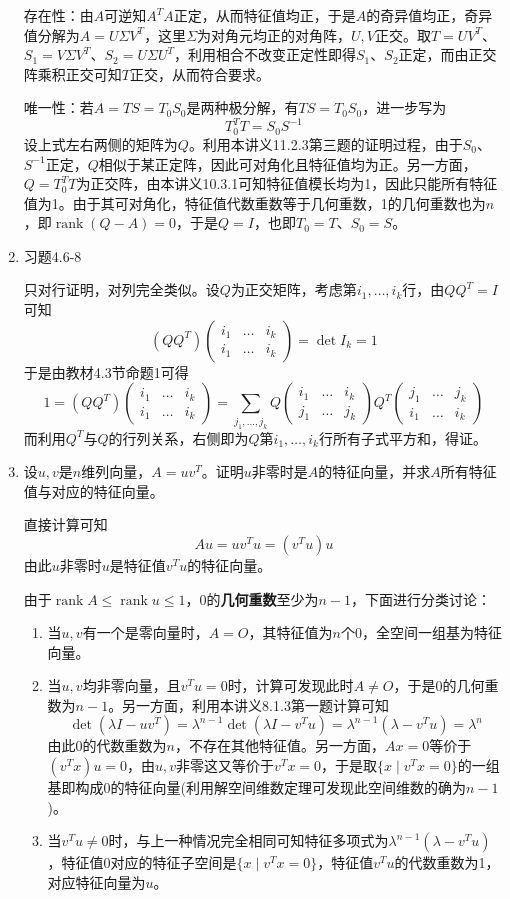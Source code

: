 \documentclass[a4paper,UTF8,fontset=windows]{ctexart}
\DeclareMathOperator{\rank}{rank}
\begin{document}
\begin{enumerate}
    存在性：由$A$可逆知$A^TA$正定，从而特征值均正，于是$A$的奇异值均正，奇异值分解为$A=U\Sigma V^T$，这里$\Sigma$为对角元均正的对角阵，$U,V$正交。取$T=UV^T$、$S_1=V\Sigma V^T$、$S_2=U\Sigma U^T$，利用相合不改变正定性即得$S_1$、$S_2$正定，而由正交阵乘积正交可知$T$正交，从而符合要求。

    唯一性：若$A=TS=T_0S_0$是两种极分解，有$TS=T_0S_0$，进一步写为
    $$T_0^TT=S_0S^{-1}$$
    设上式左右两侧的矩阵为$Q$。利用本讲义11.2.3第三题的证明过程，由于$S_0$、$S^{-1}$正定，$Q$相似于某正定阵，因此可对角化且特征值均为正。另一方面，$Q=T_0^TT$为正交阵，由本讲义10.3.1可知特征值模长均为1，因此只能所有特征值为1。由于其可对角化，特征值代数重数等于几何重数，1的几何重数也为$n$，即$\rank(Q-A)=0$，于是$Q=I$，也即$T_0=T$、$S_0=S$。

    \item 习题4.6-8
    
    只对行证明，对列完全类似。设$Q$为正交矩阵，考虑第$i_1,\dots,i_k$行，由$QQ^T=I$可知
    $$(QQ^T)\begin{pmatrix}i_1&\dots&i_k\\i_1&\dots&i_k\end{pmatrix}=\det I_k=1$$
    于是由教材4.3节命题1可得
    $$1=(QQ^T)\begin{pmatrix}i_1&\dots&i_k\\i_1&\dots&i_k\end{pmatrix}=\sum_{j_1,\dots,j_k}Q\begin{pmatrix}i_1&\dots&i_k\\j_1&\dots&j_k\end{pmatrix}Q^T\begin{pmatrix}j_1&\dots&j_k\\i_1&\dots&i_k\end{pmatrix}$$
    而利用$Q^T$与$Q$的行列关系，右侧即为$Q$第$i_1,\dots,i_k$行所有子式平方和，得证。

    \item 设$u,v$是$n$维列向量，$A=uv^T$。证明$u$非零时是$A$的特征向量，并求$A$所有特征值与对应的特征向量。
    
    直接计算可知
    $$Au=uv^Tu=(v^Tu)u$$
    由此$u$非零时$u$是特征值$v^Tu$的特征向量。

    由于$\rank A\le\rank u\le1$，0的\textbf{几何重数}至少为$n-1$，下面进行分类讨论：
    \begin{enumerate}
        \item 当$u,v$有一个是零向量时，$A=O$，其特征值为$n$个0，全空间一组基为特征向量。
        \item 当$u,v$均非零向量，且$v^Tu=0$时，计算可发现此时$A\ne O$，于是0的几何重数为$n-1$。另一方面，利用本讲义8.1.3第一题计算可知
        $$\det(\lambda I-uv^T)=\lambda^{n-1}\det(\lambda I-v^Tu)=\lambda^{n-1}(\lambda-v^Tu)=\lambda^n$$
        由此0的代数重数为$n$，不存在其他特征值。另一方面，$Ax=0$等价于$(v^Tx)u=0$，由$u,v$非零这又等价于$v^Tx=0$，于是取$\{x\mid v^Tx=0\}$的一组基即构成0的特征向量(利用解空间维数定理可发现此空间维数的确为$n-1$)。
        \item 当$v^Tu\ne0$时，与上一种情况完全相同可知特征多项式为$\lambda^{n-1}(\lambda-v^Tu)$，特征值0对应的特征子空间是$\{x\mid v^Tx=0\}$，特征值$v^Tu$的代数重数为1，对应特征向量为$u$。
    \end{enumerate}


\end{enumerate}
\end{document}
